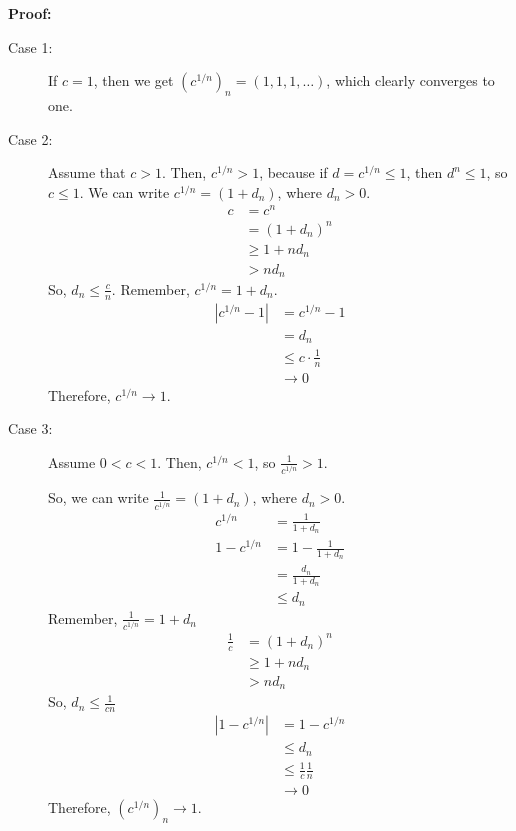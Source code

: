 \documentclass[10pt]{extarticle}
\begin{document}
  \textbf{Proof:}
    \begin{description}
      \item[Case 1:] If $c = 1$, then we get $\left(c^{1/n}\right)_n = (1,1,1,\dots)$, which clearly converges to one.
      \item[Case 2:] Assume that $c > 1$. Then, $c^{1/n} > 1$, because if $d = c^{1/n} \leq 1$, then $d^n \leq 1$, so $c \leq 1$. We can write $c^{1/n} = (1 + d_n)$, where $d_n > 0$.
        \begin{align*}
          c &= c^n\\
            &= (1+d_n)^n\\
            &\geq 1 + nd_n \tag*{Bernoulli's Inequality}\\
            &> nd_n
        \end{align*}
        So, $d_n \leq \frac{c}{n}$. Remember, $c^{1/n} = 1 + d_n$.
        \begin{align*}
          |c^{1/n} - 1| &= c^{1/n} - 1\\
                        &= d_n\\
                        &\leq c \cdot \frac{1}{n}\\
                        &\rightarrow 0
        \end{align*}
        Therefore, $c^{1/n} \rightarrow 1$.\newline
      \item[Case 3:] Assume $0 < c < 1$. Then, $c^{1/n} <1$, so $\frac{1}{c^{1/n}} > 1$.\newline

        So, we can write $\frac{1}{c^{1/n}} = (1 + d_n)$, where $d_n > 0$.
        \begin{align*}
          c^{1/n}&=\frac{1}{1 + d_n}\\
          1-c^{1/n} &= 1-\frac{1}{1+d_n}\\
                    &= \frac{d_n}{1+d_n}\\
                    &\leq d_n
        \end{align*}
        Remember, $\frac{1}{c^{1/n}} = 1 + d_n$
        \begin{align*}
          \frac{1}{c} &= (1+d_n)^n\\
                      &\geq 1 + nd_n\\
                      &> nd_n
        \end{align*}
        So, $d_n \leq \frac{1}{cn}$
        \begin{align*}
          |1-c^{1/n}| &= 1-c^{1/n}\\
                      &\leq d_n\\
                      &\leq \frac{1}{c}\frac{1}{n}\\
                      &\rightarrow 0
        \end{align*}
        Therefore, $\left(c^{1/n}\right)_n \rightarrow 1$.
    \end{description}
\end{document}
